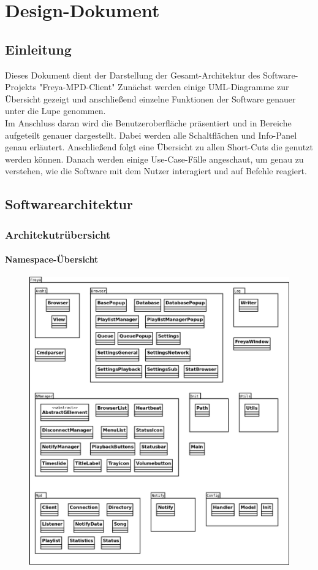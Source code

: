 \chapter{Design-Dokument}
\section{Einleitung}
Dieses Dokument dient der Darstellung der Gesamt-Architektur des Software-Projekts "Freya-MPD-Client"
Zunächst werden einige UML-Diagramme zur Übersicht gezeigt und anschließend einzelne Funktionen der
Software genauer unter die Lupe genommen.\ \\
Im Anschluss daran wird die Benutzeroberfläche präsentiert und in Bereiche aufgeteilt genauer dargestellt.
Dabei werden alle Schaltflächen und Info-Panel genau erläutert.
Anschließend folgt eine Übersicht zu allen Short-Cuts die genutzt werden können.
Danach werden einige Use-Case-Fälle angeschaut, um genau zu verstehen, wie die Software mit dem Nutzer
interagiert und auf Befehle reagiert.
\section{Softwarearchitektur}
\subsection{Architekutrübersicht}
\subsubsection{Namespace-Übersicht}
\begin{figure}[h]
\centering
\includegraphics[scale=0.5]{Namespace_Uebersicht.png}
\end{figure}
